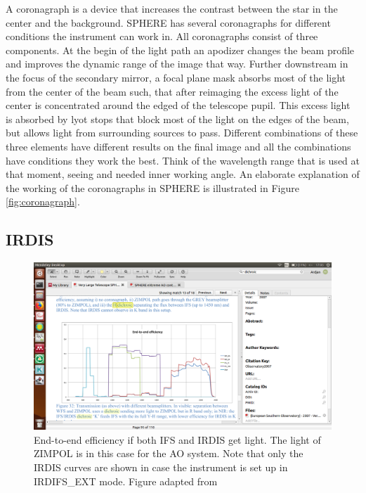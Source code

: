 \documentclass[twoside,single]{lion-msc}
\begin{document}
A coronagraph is a device that increases the contrast between the star in the center and the background. SPHERE has several coronagraphs for different conditions the instrument can work in. All coronagraphs consist of three components. At the begin of the light path an apodizer changes the beam profile and improves the dynamic range of the image that way. Further downstream in the focus of the secondary mirror, a focal plane mask absorbs most of the light from the center of the beam such, that after reimaging the excess light of the center is concentrated around the edged of the telescope pupil. This excess light is absorbed by lyot stops that block most of the light on the edges of the beam, but allows light from surrounding sources to pass. Different combinations of these three elements have different results on the final image and all the combinations have conditions they work the best. Think of the wavelength range that is used at that moment, seeing and needed inner working angle. An elaborate explanation of the working of the coronagraphs in SPHERE is illustrated in Figure \ref{fig:coronagraph}.

\subsection{IRDIS}
\begin{figure}[!b]
\centering
\includegraphics[trim={4cm 4.3cm 16cm 9cm},clip,width = \textwidth]{systemthroughput}
\caption{End-to-end efficiency if both IFS and IRDIS get light. The light of ZIMPOL is in this case for the AO system. Note that only the IRDIS curves are shown in case the instrument is set up in IRDIFS\_EXT mode. Figure adapted from \cite{Observatory2007}}
\label{fig:systemthrougput}
\end{figure}
\end{document}
